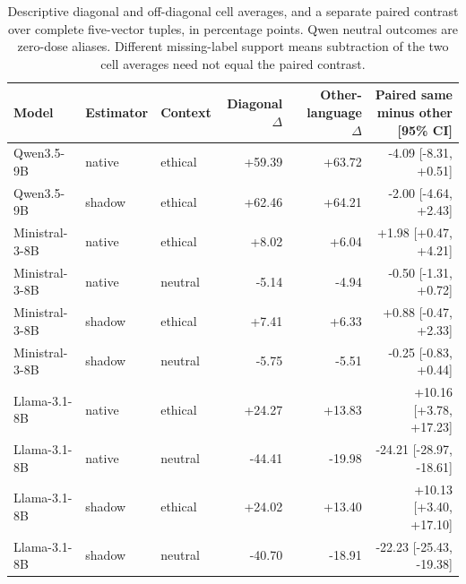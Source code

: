 \begin{table}[t]\centering\scriptsize
\begin{tabular}{lllrrr}\toprule
Model & Estimator & Context & Diagonal $\Delta$ & Other-language $\Delta$ & Paired same minus other [95\% CI] \\\midrule
Qwen3.5-9B & native & ethical & +59.39 & +63.72 & -4.09 [-8.31, +0.51] \\
Qwen3.5-9B & shadow & ethical & +62.46 & +64.21 & -2.00 [-4.64, +2.43] \\
Ministral-3-8B & native & ethical & +8.02 & +6.04 & +1.98 [+0.47, +4.21] \\
Ministral-3-8B & native & neutral & -5.14 & -4.94 & -0.50 [-1.31, +0.72] \\
Ministral-3-8B & shadow & ethical & +7.41 & +6.33 & +0.88 [-0.47, +2.33] \\
Ministral-3-8B & shadow & neutral & -5.75 & -5.51 & -0.25 [-0.83, +0.44] \\
Llama-3.1-8B & native & ethical & +24.27 & +13.83 & +10.16 [+3.78, +17.23] \\
Llama-3.1-8B & native & neutral & -44.41 & -19.98 & -24.21 [-28.97, -18.61] \\
Llama-3.1-8B & shadow & ethical & +24.02 & +13.40 & +10.13 [+3.40, +17.10] \\
Llama-3.1-8B & shadow & neutral & -40.70 & -18.91 & -22.23 [-25.43, -19.38] \\
\bottomrule\end{tabular}
\caption{Descriptive diagonal and off-diagonal cell averages, and a separate
paired contrast over complete five-vector tuples, in percentage points.
Qwen neutral outcomes are zero-dose aliases. Different missing-label support
means subtraction of the two cell averages need not equal the paired contrast.}
\label{tab:reviewer-language-diagonal}\end{table}
